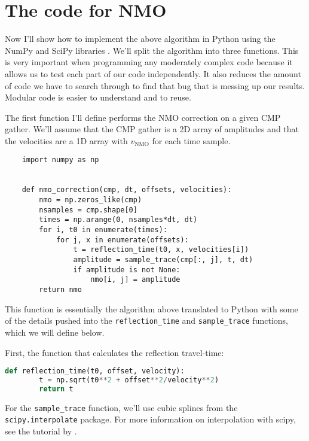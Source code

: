 \section{The code for NMO}

Now I'll show how to implement the above algorithm in Python using the NumPy and SciPy libraries \citep{van_der_Walt_2011}.
We'll split the algorithm into three functions.
This is very important when programming any moderately complex code because it allows us to test each part of our code independently.
It also reduces the amount of code we have to search through to find that bug that is messing up our results.
Modular code is easier to understand and to reuse.

The first function I'll define performs the NMO correction on a given CMP gather.
We'll assume that the CMP gather is a 2D array of amplitudes and that the
velocities are a 1D array with $v_\mathrm{NMO}$ for each time sample.

\begin{verbatim}
    import numpy as np


    def nmo_correction(cmp, dt, offsets, velocities):
        nmo = np.zeros_like(cmp)
        nsamples = cmp.shape[0]
        times = np.arange(0, nsamples*dt, dt)
        for i, t0 in enumerate(times):
            for j, x in enumerate(offsets):
                t = reflection_time(t0, x, velocities[i])
                amplitude = sample_trace(cmp[:, j], t, dt)
                if amplitude is not None:
                    nmo[i, j] = amplitude
        return nmo
\end{verbatim}

This function is essentially the algorithm above translated to Python with some
of the details pushed into the \texttt{reflection\_time} and
\texttt{sample\_trace} functions, which we will define below.

First, the function that calculates the reflection travel-time:

\begin{lstlisting}[language=python]
    def reflection_time(t0, offset, velocity):
        t = np.sqrt(t0**2 + offset**2/velocity**2)
        return t
\end{lstlisting}

For the \texttt{sample\_trace} function, we'll use cubic splines from the
\texttt{scipy.interpolate} package.
For more information on interpolation with scipy, see the tutorial by
\citet{Hall_2016}.

